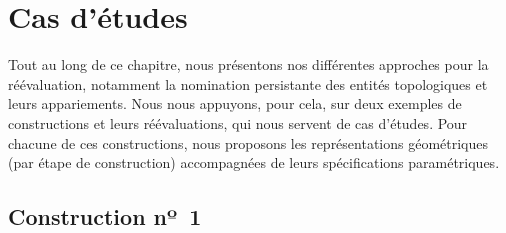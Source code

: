 \section{Cas d'études}
\label{sec:reevaluation-base-regles-cas-etude}


Tout au long de ce chapitre, nous présentons nos différentes approches pour la
réévaluation, notamment la nomination persistante des entités topologiques et
leurs appariements. Nous nous appuyons, pour cela, sur deux exemples de constructions et leurs réévaluations, qui
nous servent de cas d'études. %
Pour chacune de ces constructions, nous proposons les représentations
géométriques (par étape de construction) accompagnées de leurs spécifications
paramétriques. %

\subsection{Construction nº~1}
\label{sec:reevaluation-base-regles-premier-cas}

